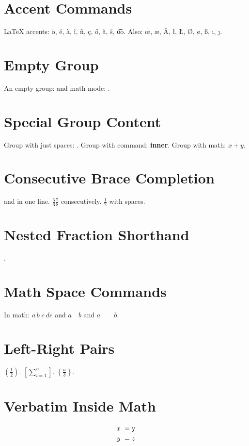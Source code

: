 \documentclass{article}
\begin{document}
\section{Accent Commands}
LaTeX accents: \"{o}, \'{e}, \`{a}, \^{i}, \~{n}, \c{c}, \H{o}, \u{a}, \v{s}, \t{oo}.
Also: \oe, \ae, \AA, \l, \L, \O, \o, \ss, \i, \j.

\section{Empty Group}
An empty group: {} and math mode: ${}$.

\section{Special Group Content}
Group with just spaces: { }.
Group with command: {\textbf{inner}}.
Group with math: {$x + y$}.

\section{Consecutive Brace Completion}
 and  in one line.
$\frac{5}{6}\frac{7}{8}$ consecutively.
$\frac{1}{2}$ with spaces.

\section{Nested Fraction Shorthand}
.

\section{Math Space Commands}
In math: $a\,b\;c\:d\!e$ and $a\quad b$ and $a\qquad b$.

\section{Left-Right Pairs}
$\left( \frac{1}{2} \right)$.
$\left[ \sum_{i=1}^{n} \right]$.
$\left\{ \frac{a}{b} \right\}$.

\section{Verbatim Inside Math}
\begin{align}
  x \ & = \verb|y| \\
  y \ & = z
\end{align}
\end{document}
